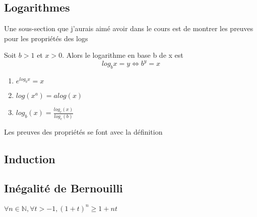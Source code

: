 \documentclass{article}
\begin{document}
\subsection{Logarithmes}%
\label{sub:Logarithmes}

Une sous-section que j'aurais aimé avoir dans le cours est de montrer les
preuves pour les propriétés des logs

\begin{definition}[Logarithmes]
    Soit $ b > 1$ et $ x>0$. Alors le logarithme en base b de x est
    $$ log_b x = y \Longleftrightarrow b^y = x $$
\end{definition}

\begin{theorem}
    \begin{enumerate}
	\item $ e^{log_b x} = x $
	\item $ log(x^a) = a log(x) $
	\item $ log_b (x) = \frac{log_c(x)}{log_c(b)} $
    \end{enumerate}
\end{theorem}

\begin{remark}
    Les preuves des propriétés se font avec la définition
\end{remark}

\subsection{Induction}


\subsection{Inégalité de Bernouilli}

\begin{theorem}
    $ \forall n \in \mathbb{N}, \forall t > -1, (1+t)^n \geq 1+nt$
\end{theorem}
\end{document}
